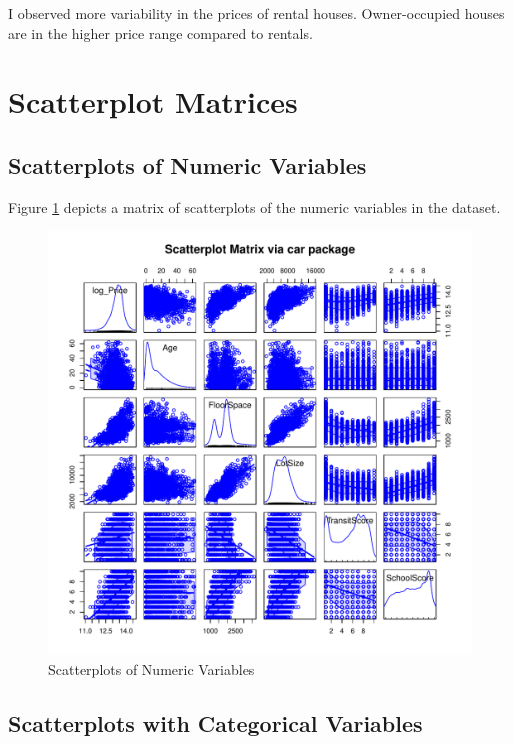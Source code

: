 I observed more variability in the prices of rental houses. 
Owner-occupied houses are in the higher price range compared to rentals.

\section*{Scatterplot Matrices}


\subsection*{Scatterplots of Numeric Variables}

Figure \ref{fig:slpom_num_only} depicts a matrix of scatterplots
of the numeric variables in the dataset.


\begin{figure}[h!]
  \centering
  \includegraphics[scale = 0.5, keepaspectratio=true]{../Figures/slpom_num_only}
  \caption{Scatterplots of Numeric Variables} \label{fig:slpom_num_only}
\end{figure}


\pagebreak
\subsection*{Scatterplots with Categorical Variables}

